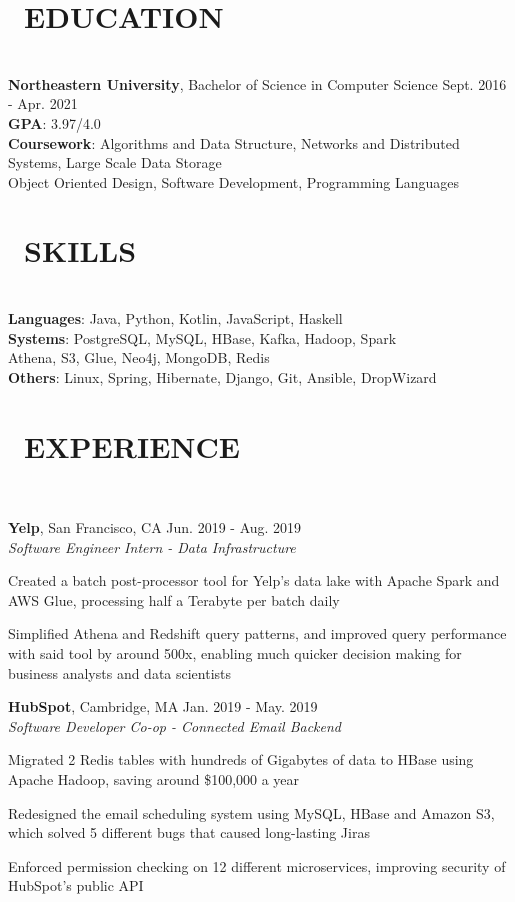 \documentclass[11pt]{res}
\newcommand{\sectionunderline}{\vspace{-3mm}\hrulefill\\}
\newcommand{\listingtab}{\tabto{2.8cm}}
\newcommand{\newsect}[1]{\section{\Large \bf #1}}
\newcommand{\email}[1]{\faEnvelope\hspace{1mm} \href{mailto:#1}{#1}}
\newcommand{\github}[1]{\faGithubAlt\hspace{1mm} \href{https://github.com/#1}{#1}}
\newcommand{\linkedin}[1]{\faLinkedinSquare\hspace{1mm} \href{https://linkedin.com/in/#1}{#1}}
\begin{document}
\address{
  \large\email{derekpham67@gmail.com}\:
  \large{$\bullet$}
  \large\github{derekpham}\:
  \large{$\bullet$}
  \large\linkedin{derek-pham97}\\
}

\begin{resume}
  \newsect{\faGraduationCap\ EDUCATION}{
    \sectionunderline{
      {\bf Northeastern University}, Bachelor of Science in Computer Science \hfill Sept. 2016 - Apr. 2021\\
      {\bf GPA}: \listingtab 3.97/4.0\\
      {\bf Coursework}: \listingtab Algorithms and Data Structure, Networks and Distributed Systems, Large Scale Data Storage\\
      \listingtab Object Oriented Design, Software Development, Programming Languages
    }
  }

  \newsect{\faCogs\ SKILLS}{
    \sectionunderline{
      {\bf Languages}: \listingtab Java, Python, Kotlin, JavaScript, Haskell\\
      {\bf Systems}: \listingtab PostgreSQL, MySQL, HBase, Kafka, Hadoop, Spark\\
      \listingtab Athena, S3, Glue, Neo4j, MongoDB, Redis\\
      {\bf Others}: \listingtab Linux, Spring, Hibernate, Django, Git, Ansible, DropWizard
    }
  }

  \newsect{\faUsers\ EXPERIENCE}{
    \sectionunderline{
      {\bf Yelp}, San Francisco, CA \hfill Jun. 2019 - Aug. 2019\\
      {\it Software Engineer Intern - Data Infrastructure}
      \begin{itemize}
        {\item Created a batch post-processor tool for Yelp's data lake with Apache Spark and AWS Glue, processing half a Terabyte per batch daily}
        {\item Simplified Athena and Redshift query patterns, and improved query performance with said tool by around 500x, enabling much quicker decision making for business analysts and data scientists}
      \end{itemize}

      {\bf HubSpot}, Cambridge, MA \hfill Jan. 2019 - May. 2019\\
      {\it Software Developer Co-op - Connected Email Backend}
      \begin{itemize}
        {\item Migrated 2 Redis tables with hundreds of Gigabytes of data to HBase using Apache Hadoop, saving around \$100,000 a year}
        {\item Redesigned the email scheduling system using MySQL, HBase and Amazon S3, which solved 5 different bugs that caused long-lasting Jiras}
        {\item Enforced permission checking on 12 different microservices, improving security of HubSpot's public API}
      \end{itemize}

}}
\end{resume}
\end{document}
